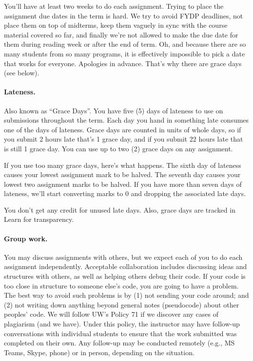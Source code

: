 \documentclass[letterpaper,10pt]{article}
\begin{document}
You'll have at least two weeks to do each assignment. Trying to place the assignment due dates in the term is hard. We try to avoid FYDP deadlines, not place them on top of midterms, keep them vaguely in sync with the course material covered so far, and finally we're not allowed to make the due date for them during reading week or after the end of term. Oh, and because there are so many students from so many programs, it is effectively impossible to pick a date that works for everyone. Apologies in advance. That's why there are grace days (see below).


\paragraph{Lateness.} Also known as ``Grace Days''. You have five (5) days of lateness to use on  submissions throughout the term. Each day you hand in something late consumes one of the days of lateness. Grace days are counted in units of whole days, so if you submit 2 hours late that's 1 grace day, and if you submit 22 hours late that is still 1 grace day. You can use up to two (2) grace days on any assignment. 

If you use too many grace days, here's what happens. The sixth day of lateness causes your lowest assignment mark to be halved. The seventh day causes your lowest two assignment marks to be halved. If you have more than seven days of lateness, we'll start converting marks to 0 and dropping the associated late days.

You don't get any credit for unused late days. Also, grace days are tracked in Learn for transparency.

\paragraph{Group work.} 
You may discuss assignments with others, but we expect each of you to
do each assignment independently. Acceptable collaboration includes
discussing ideas and structures with others, as well as helping others
debug their code. If your code is too close in structure to someone
else's code, you are going to have a problem. The best way to avoid
such problems is by (1) not sending your code around; and (2) not
writing down anything beyond general notes (pseudocode) about other
peoples' code. We will follow UW's Policy 71 if we discover any cases of
plagiarism (and we have). Under this policy, the instructor may have follow-up conversations with individual students to ensure that the work submitted was completed on their own. Any follow-up may be conducted remotely (e.g., MS Teams, Skype, phone) or in person, depending on the situation.
\end{document}
